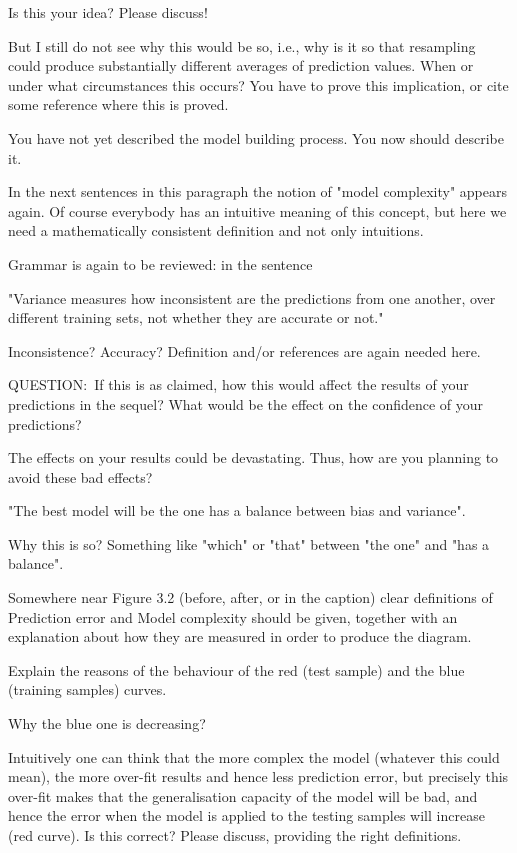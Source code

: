 \documentclass[12pt,reqno]{amsart}
\def\blue#1{{\color{blue} #1}}
\def\red#1{{\color{red} #1}}
\begin{document}
\begin{description}[style=unboxed,leftmargin=0cm,itemsep=3ex]
Is this your idea? Please discuss!

But I still do not see \red{why this would be so}, i.e., why is it so
that resampling could produce substantially different averages of
prediction values.
When or under what circumstances this occurs?
You have to prove this implication, or cite some reference where this
is proved.

\red{You have not yet described the model building process.
You now should describe it.}

In the next sentences in this paragraph the notion of "model complexity"
appears again.
Of course everybody has an intuitive meaning of this concept, but here
we need a mathematically consistent definition and not only intuitions.

Grammar is again to be reviewed: in the sentence 

"Variance measures how inconsistent are the predictions from one another,
over different training sets, not whether they are accurate or not."

Inconsistence? Accuracy? Definition and/or references are again needed here.
 
\blue{QUESTION:}\ 
If this is as claimed, how this would affect the results of your predictions
in the sequel? 
What would be the effect on the confidence of your predictions?

The effects on your results could be devastating.
Thus, how are you planning to avoid these bad effects?

"The best model will be the one has a balance between bias and variance".

Why this is so? 
Something like "which" or "that" between "the one" and "has a balance".


Somewhere near Figure 3.2 (before, after, or in the caption) clear
definitions of \red{Prediction error} and \red{Model complexity}
should be given, together with an explanation about how they are
measured in order to produce the diagram.

Explain the reasons of the behaviour of the red (test sample) and the
blue (training samples) curves. 

Why the blue one is decreasing? 

Intuitively one can think that the more complex the model (whatever
this could mean), the more over-fit results and hence less prediction
error, but precisely this over-fit makes that the generalisation
capacity of the model will be bad, and hence the error when the model
is applied to the testing samples will increase (red curve). 
Is this correct?
Please discuss, providing the right definitions.



\end{description}
\end{document}
